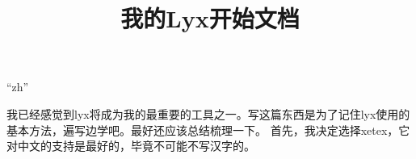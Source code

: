 \documentclass[11pt,a4paper]{article}
\begin{document}
\XeTeXlinebreaklocale ``zh''
\title{我的Lyx开始文档}
\maketitle

我已经感觉到lyx将成为我的最重要的工具之一。写这篇东西是为了记住lyx使用的基本方法，遍写边学吧。最好还应该总结梳理一下。
首先，我决定选择xetex，它对中文的支持是最好的，毕竟不可能不写汉字的。
\end{document}
